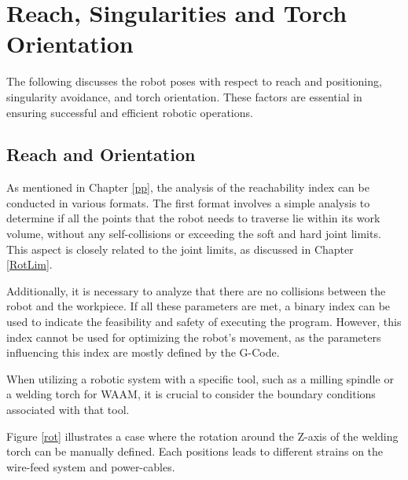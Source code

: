 \section{Reach, Singularities and Torch Orientation}
The following discusses the robot poses with respect to reach and positioning, singularity avoidance, and torch orientation. These factors are essential in ensuring successful and efficient robotic operations.

\subsection{Reach and Orientation}\label{RO}

As mentioned in Chapter \ref{pp}, the analysis of the reachability index can be conducted in various formats. The first format involves a simple analysis to determine if all the points that the robot needs to traverse lie within its work volume, without any self-collisions or exceeding the soft and hard joint limits. This aspect is closely related to the joint limits, as discussed in Chapter \ref{RotLim}. 

Additionally, it is necessary to analyze that there are no collisions between the robot and the workpiece. If all these parameters are met, a binary index can be used to indicate the feasibility and safety of executing the program. However, this index cannot be used for optimizing the robot's movement, as the parameters influencing this index are mostly defined by the G-Code.

When utilizing a robotic system with a specific tool, such as a milling spindle or a welding torch for WAAM, it is crucial to consider the boundary conditions associated with that tool. 




Figure \ref{rot} illustrates a case where the rotation around the Z-axis of the welding torch can be manually defined. Each positions leads to different strains on the wire-feed system and power-cables.

